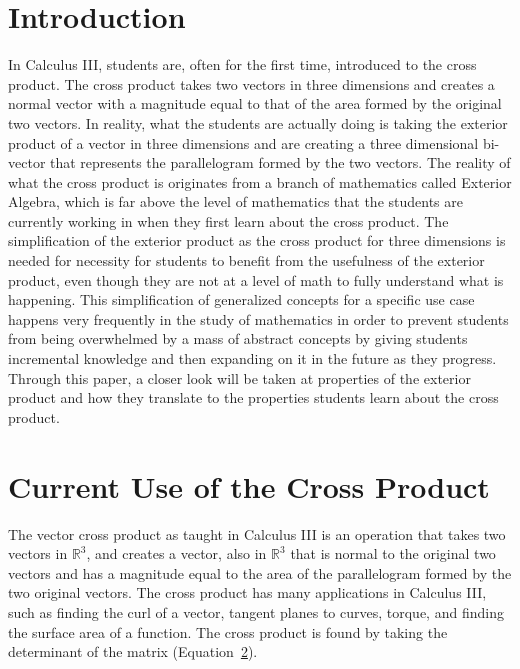 \documentclass{amsart}
\begin{document}
	\section{Introduction} \label{intro}
		In Calculus III, students are, often for the first time, introduced to the cross product. The cross product takes two vectors in three dimensions and creates a normal vector with a magnitude equal to that of the area formed by the original two vectors. In reality, what the students are actually doing is taking the exterior product of a vector in three dimensions and are creating a three dimensional bi-vector that represents the parallelogram formed by  the two vectors. The reality of what the cross product is originates from a branch of mathematics called Exterior Algebra, which is far above the level of mathematics that the students are currently working in when they first learn about the cross product. The simplification of the exterior product as the cross product for three dimensions is needed for necessity for students to benefit from the usefulness of the exterior product, even though they are not at a level of math to fully understand what is happening. This simplification of generalized concepts for a specific use case happens very frequently in the study of mathematics in order to prevent students from being overwhelmed by a mass of abstract concepts by giving students incremental knowledge and then expanding on it in the future as they progress. Through this paper, a closer look will be taken at properties of the exterior product and how they translate to the properties students learn about the cross product.
		
	\section{Current Use of the Cross Product} \label{cross}
		The vector cross product as taught in Calculus III is an operation that takes two vectors in $\mathbb{R}^3$, and creates a vector, also in $\mathbb{R}^3$ that is normal to the original two vectors and has a magnitude equal to the area of the parallelogram formed by the two original vectors. The cross product has many applications in Calculus III, such as finding the curl of a vector, tangent planes to curves, torque, and finding the surface area of a function. The cross product is found by taking the determinant of the matrix (Equation~\ref{cross}). 
		
\end{document}
